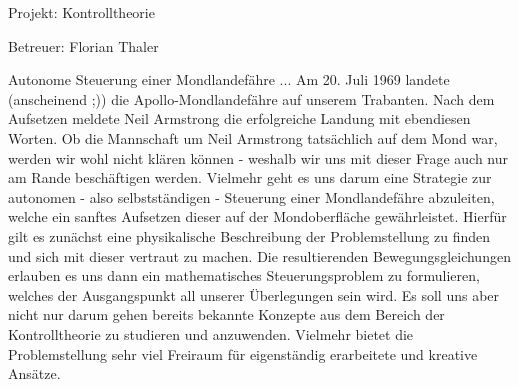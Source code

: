 \documentclass[a4paper,10pt]{article}
\theoremstyle{plain}
\theoremstyle{definition}
\theoremstyle{remark}
\begin{document}
	Projekt: Kontrolltheorie
	
	Betreuer: Florian Thaler
	
	Autonome Steuerung einer Mondlandefähre
	\newline
	\newline
	\noindent
	 ... Am 20. Juli 1969 landete (anscheinend ;)) die Apollo-Mondlandefähre auf unserem Trabanten. Nach dem Aufsetzen meldete Neil Armstrong die erfolgreiche Landung mit ebendiesen Worten. Ob die Mannschaft um Neil Armstrong tatsächlich auf dem Mond war, werden wir wohl nicht klären können - weshalb wir uns mit dieser Frage auch nur am Rande beschäftigen werden. 
	\newline
	Vielmehr geht es uns darum eine Strategie zur autonomen - also selbstständigen - Steuerung einer Mondlandefähre abzuleiten, welche ein sanftes Aufsetzen dieser auf der Mondoberfläche gewährleistet. Hierfür gilt es zunächst eine physikalische Beschreibung der Problemstellung zu finden und sich mit dieser vertraut zu machen. Die resultierenden Bewegungsgleichungen erlauben es uns dann ein mathematisches Steuerungsproblem zu formulieren, welches der Ausgangspunkt all unserer Überlegungen sein wird.
	\newline
	Es soll uns aber nicht nur darum gehen bereits bekannte Konzepte aus dem Bereich der Kontrolltheorie zu studieren und anzuwenden. Vielmehr bietet die Problemstellung sehr viel Freiraum für eigenständig erarbeitete und kreative Ansätze.
\end{document}
